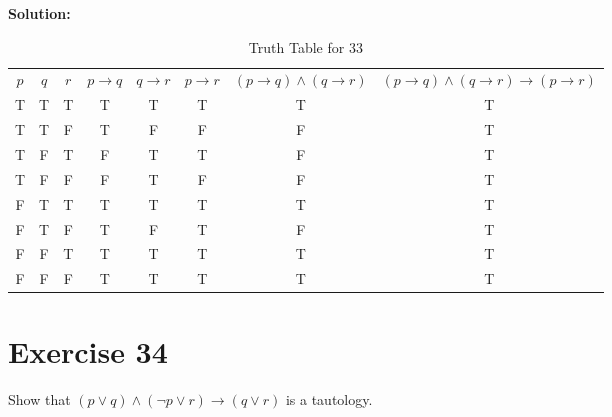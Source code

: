 \documentclass{Axon}
\begin{document}
\noindent
\textbf{Solution:}
\begin{table}[ht]
    \centering
    \begin{tabular}{c|c|c|c|c|c|c|c}
        \(p\) & \(q\) & \(r\) & \(p \to q\) & \(q \to r\) & \(p \to r\) & \((p \to q) \land (q \to r)\) & \((p \to q) \land (q \to r) \to (p \to r)\) \\
        T     & T     & T     & T           & T           & T           & T                             & T                                           \\
        T     & T     & F     & T           & F           & F           & F                             & T                                           \\
        T     & F     & T     & F           & T           & T           & F                             & T                                           \\
        T     & F     & F     & F           & T           & F           & F                             & T                                           \\
        F     & T     & T     & T           & T           & T           & T                             & T                                           \\
        F     & T     & F     & T           & F           & T           & F                             & T                                           \\
        F     & F     & T     & T           & T           & T           & T                             & T                                           \\
        F     & F     & F     & T           & T           & T           & T                             & T
    \end{tabular}
    \caption{Truth Table for 33}
\end{table}

\section*{Exercise 34}
Show that \((p \lor q) \land (\lnot p \lor r) \to (q \lor r)\) is a tautology.
\end{document}
